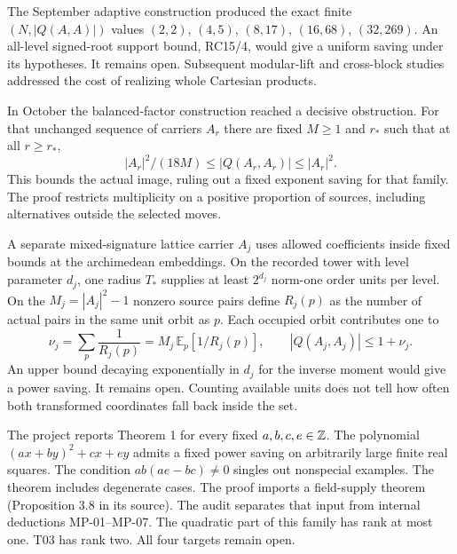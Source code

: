 The September adaptive construction produced the exact finite $(N,|Q(A,A)|)$ values $(2,2)$, $(4,5)$, $(8,17)$, $(16,68)$, $(32,269)$. An all-level signed-root support bound, RC15/4, would give a uniform saving under its hypotheses. It remains open. Subsequent modular-lift and cross-block studies addressed the cost of realizing whole Cartesian products. 

In October the balanced-factor construction reached a decisive obstruction. For that unchanged sequence of carriers $A_r$ there are fixed $M\ge1$ and $r_*$ such that at all $r\ge r_*$,
\[
    |A_r|^2/(18M)\le |Q(A_r,A_r)|\le |A_r|^2.
\]
This bounds the actual image, ruling out a fixed exponent saving for that family. The proof restricts multiplicity on a positive proportion of sources, including alternatives outside the selected moves. 

A separate mixed-signature lattice carrier $A_j$ uses allowed coefficients inside fixed bounds at the archimedean embeddings. On the recorded tower with level parameter $d_j$, one radius $T_*$ supplies at least $2^{d_j}$ norm-one order units per level. On the $M_j=|A_j|^2-1$ nonzero source pairs define $R_j(p)$ as the number of actual pairs in the same unit orbit as $p$. Each occupied orbit contributes one to
\[
  \nu_j=\sum_p\frac{1}{R_j(p)}
       =M_j\,\mathbb E_p\!\left[1/R_j(p)\right],
  \qquad |Q(A_j,A_j)|\le 1+\nu_j.
\]
An upper bound decaying exponentially in $d_j$ for the inverse moment would give a power saving. It remains open. Counting available units does not tell how often both transformed coordinates fall back inside the set. 

The project reports Theorem 1 for every fixed $a,b,c,e\in\mathbb Z$. The polynomial $(ax+by)^2+cx+ey$ admits a fixed power saving on arbitrarily large finite real squares. The condition $ab(ae-bc)\ne0$ singles out nonspecial examples. The theorem includes degenerate cases. The proof imports a field-supply theorem (Proposition 3.8 in its source). The audit separates that input from internal deductions MP-01--MP-07. The quadratic part of this family has rank at most one. T03 has rank two. All four targets remain open. 
